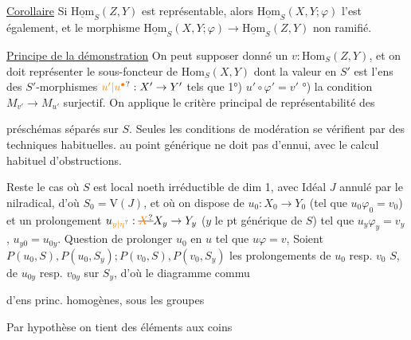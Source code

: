 \uline{Corollaire} Si $\underline{\mathrm{Hom}}_S(Z,Y)$ est représentable, alors $\underline{\mathrm{Hom}}_S(X,Y;\varphi)$ l'est également, et le morphisme $\underline{\mathrm{Hom}}_S(X,Y;\varphi)\longrightarrow\underline{\mathrm{Hom}}_S(Z,Y)$  non ramifié.

\uline{Principe de la démonstration} On peut supposer donné un $v:\mathrm{Hom}_S(Z,Y)$, et on doit représenter le sous-foncteur de $\mathrm{Hom}_S(X,Y)$ dont la valeur en $S'$ est l'ens des $S'$-morphismes $\unsure{u'|u^{\bullet}}:X'\to Y'$ tels que 1°) $u'\circ\varphi'=v'$ °) la condition $M_{v'}\to M_{u'}$ surjectif. On applique le critère principal de représentabilité  des 

préschémas   séparés sur $S$. Seules les  conditions de modération se vérifient par des techniques habituelles.   au point générique ne doit pas  d'ennui, avec le calcul habituel d'obstructions.

Reste le cas où $S$ est local noeth irréductible de dim 1, avec Idéal $J$ annulé par le nilradical, d'où $S_0=\mathrm V(J)$, et où on dispose de $u_0:X_0\to Y_0$ (tel que $u_0\varphi_0=v_0$) et un prolongement $u_{\unsure{y|\eta}}:\deleted{\unsure{X}}X_y\to Y_y$ ($y$ le pt générique de $S$) tel que $u_y\varphi_y=v_y$, $u_{y0}=u_{0y}$. Question de prolonger $u_0$ en $u$ tel que $u\varphi=v$,  Soient $P(u_0,S),P(u_0,S_y);P(v_0,S),P(v_0,S_y)$ les prolongements de $u_0$ resp. $v_0$  $S$,  de $u_{0y}$ resp. $v_{0y}$ sur $S_y$, d'où le diagramme commu

d'ens  princ. homogènes, sous les groupes

Par hypothèse on tient des éléments aux coins
